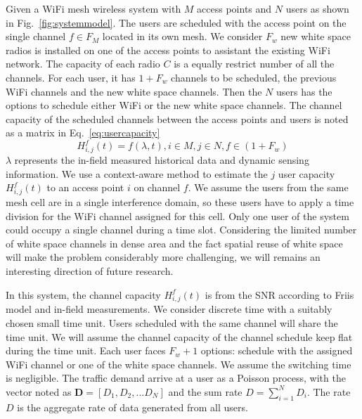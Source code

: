 Given a WiFi mesh wireless system with $M$ access points and $N$ users as shown in Fig.~\ref{fig:systemmodel}. 
The users are scheduled with the access point on the single channel $f \in F_M$ located in its own mesh. We consider $F_w$ 
new white space radios is installed on one of the access points to assistant the existing WiFi network. The 
capacity of each radio $C$ is a equally restrict number of all the channels. For each user, it has $1+F_w$ 
channels to be scheduled, the previous WiFi channels and the new white space channels. 
Then the $N$ users has the options to schedule either WiFi or the new white space channels. 
The channel capacity of the scheduled channels between the access points and users is 
noted as a matrix in Eq.~\ref{eq:usercapacity}
\begin{equation}
\label{eq:usercapacity}
H_{i,j}^f(t)= f(\lambda,t),i \in M, j\in N, f \in (1+F_w) 
\end{equation} 
$\lambda$ represents the in-field measured historical data and dynamic sensing information.
We use a context-aware method to estimate the $j$ user capacity $H_{i,j}^f(t)$ to an access point 
$i$ on channel $f$. We assume the users from the same mesh cell are in a single interference 
domain, so these users have to apply a time division for the WiFi channel assigned for this cell. 
Only one user of the system could occupy a single channel during a time slot. Considering the 
limited number of white space channels in dense area and the fact spatial reuse of white space 
will make the problem considerably more challenging, we will remains an interesting direction 
of future research. 

In this system, the channel capacity $H_{i,j}^f(t)$ is from the SNR according to Friis model and in-field 
measurements. We consider discrete time with a suitably chosen small time unit. 
Users scheduled with the same channel will share the time unit. We will assume the channel capacity of 
the channel schedule keep flat during the time unit. 
Each user faces $F_w+1$ options: schedule with the assigned WiFi channel or one of the white space 
channels. We assume the switching time is negligible. The traffic demand arrive at a user as a Poisson process, 
with the vector noted as $\bm{D} = [D_1,D_2,...D_N]$ and the sum rate $D = \sum\limits_{i=1}^N D_i$.  The rate $D$ 
is the aggregate rate of data generated from all users. 



